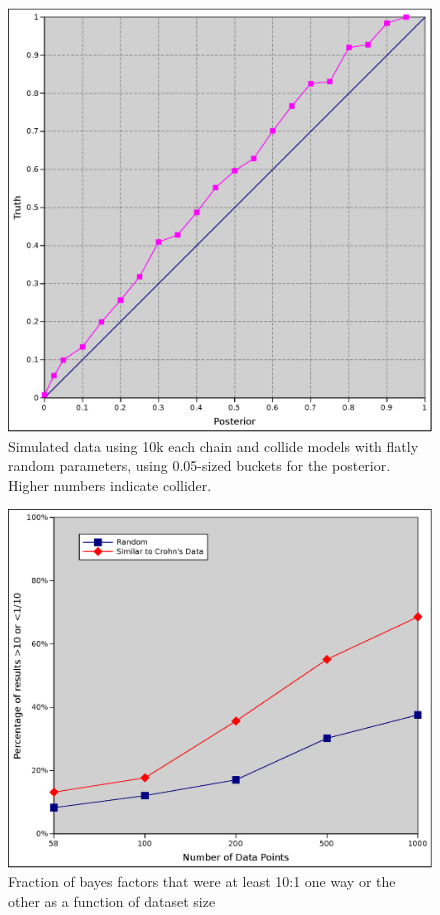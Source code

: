 \documentclass[letterpaper]{article}
\begin{document}
\begin{figure}
  \includegraphics[width=\textwidth]{direction_platonic_58}
  \caption{Simulated data using 10k each chain and collide models with
    flatly random parameters, using 0.05-sized buckets for the
    posterior.  Higher numbers indicate collider.}
  \label{dir_pla58}
\end{figure}

\begin{figure}
  \includegraphics[width=\textwidth]{usefullness}
  \caption{Fraction of bayes factors that were at least 10:1 one way
    or the other as a function of dataset size}
  \label{dir_use}
\end{figure}
\end{document}
